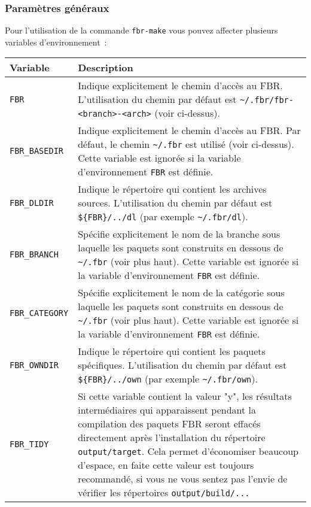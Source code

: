 \subsubsection{Paramètres généraux}

Pour l'utilisation de la commande \texttt{fbr-make} vous pouvez affecter
plusieurs variables d'environnement~:

\begin{longtable}{|l|p{10cm}|}
    \hline
    \multicolumn{1}{|l}{\textbf{Variable}} &
    \multicolumn{1}{|l|}{\textbf{Description}} \\
    \hline
    \endhead
    \hline
    \endfoot
    \endlastfoot
\texttt{FBR} &
    Indique explicitement le chemin d'accès au FBR. L'utilisation du chemin par
    défaut est \texttt{\~{}/.fbr/fbr-<branch>-<arch>} (voir ci-dessus). \\
\hline
\texttt{FBR\_BASEDIR} &
    Indique explicitement le chemin d'accès au FBR. Par défaut, le chemin \texttt{\~{}/.fbr}
	est utilisé (voir ci-dessus). Cette variable est ignorée si la variable d'environnement
	\texttt{FBR} est définie. \\
\hline
\texttt{FBR\_DLDIR} &
    Indique le répertoire qui contient les archives sources. L'utilisation du
    chemin par défaut est \texttt{\$\{FBR\}/../dl} (par exemple \texttt{\~{}/.fbr/dl}). \\
\hline
\texttt{FBR\_BRANCH} &
    Spécifie explicitement le nom de la branche sous laquelle les paquets sont construits
	en dessous de \texttt{\~{}/.fbr} (voir plus haut). Cette variable est ignorée si
	la variable d'environnement \texttt{FBR} est définie. \\
\hline
\texttt{FBR\_CATEGORY} &
    Spécifie explicitement le nom de la catégorie sous laquelle les paquets sont construits
	en dessous de \texttt{\~{}/.fbr} (voir plus haut). Cette variable est ignorée si
	la variable d'environnement \texttt{FBR} est définie. \\
\hline
\texttt{FBR\_OWNDIR} &
    Indique le répertoire qui contient les paquets spécifiques. L'utilisation du
    chemin par défaut est \texttt{\$\{FBR\}/../own} (par exemple \texttt{\~{}/.fbr/own}). \\
\hline
\texttt{FBR\_TIDY} &
    Si cette variable contient la valeur "y", les résultats intermédiaires qui
    apparaissent pendant la compilation des paquets FBR seront effacés directement
    après l'installation du répertoire \texttt{output/target}. Cela permet
    d'économiser beaucoup d'espace, en faite cette valeur est toujours recommandé,
    si vous ne vous sentez pas l'envie de vérifier les répertoires \texttt{output/build/...}

\end{longtable}
